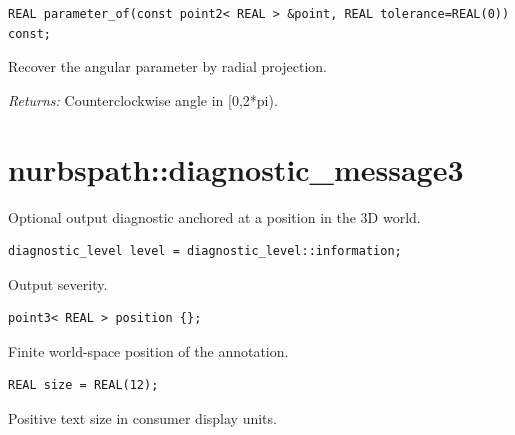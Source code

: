 \par\noindent\begin{minipage}{\linewidth}
\begin{lstlisting}[style=apireference]
REAL parameter_of(const point2< REAL > &point, REAL tolerance=REAL(0)) const;
\end{lstlisting}
{\footnotesize Recover the angular parameter by radial projection.\par}
{\footnotesize\textit{Returns:} Counterclockwise angle in [0,2*pi).\par}
\end{minipage}\par\vspace{1pt}
\section{nurbspath::diagnostic\_message3}
Optional output diagnostic anchored at a position in the 3D world.
\par\noindent\begin{minipage}{\linewidth}
\begin{lstlisting}[style=apireference]
diagnostic_level level = diagnostic_level::information;
\end{lstlisting}
{\footnotesize Output severity.\par}
\end{minipage}\par\vspace{1pt}
\par\noindent\begin{minipage}{\linewidth}
\begin{lstlisting}[style=apireference]
point3< REAL > position {};
\end{lstlisting}
{\footnotesize Finite world-space position of the annotation.\par}
\end{minipage}\par\vspace{1pt}
\par\noindent\begin{minipage}{\linewidth}
\begin{lstlisting}[style=apireference]
REAL size = REAL(12);
\end{lstlisting}
{\footnotesize Positive text size in consumer display units.\par}
\end{minipage}\par\vspace{1pt}
